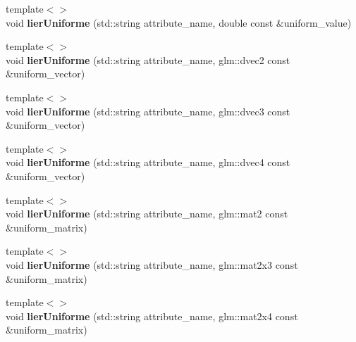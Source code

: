 \begin{DoxyCompactItemize}
\item 
\hypertarget{classopengl_1_1_programme_aee4e82a2c7e972da7a82ffae9c38397e}{}{\footnotesize template$<$$>$ }\\void {\bfseries lier\+Uniforme} (std\+::string attribute\+\_\+name, double const \&uniform\+\_\+value)\label{classopengl_1_1_programme_aee4e82a2c7e972da7a82ffae9c38397e}

\item 
\hypertarget{classopengl_1_1_programme_a0cc2298b3ed6b8075b0ef15ef4881dcc}{}{\footnotesize template$<$$>$ }\\void {\bfseries lier\+Uniforme} (std\+::string attribute\+\_\+name, glm\+::dvec2 const \&uniform\+\_\+vector)\label{classopengl_1_1_programme_a0cc2298b3ed6b8075b0ef15ef4881dcc}

\item 
\hypertarget{classopengl_1_1_programme_a7dc32e56eeb5b6170493135d510e2982}{}{\footnotesize template$<$$>$ }\\void {\bfseries lier\+Uniforme} (std\+::string attribute\+\_\+name, glm\+::dvec3 const \&uniform\+\_\+vector)\label{classopengl_1_1_programme_a7dc32e56eeb5b6170493135d510e2982}

\item 
\hypertarget{classopengl_1_1_programme_a4feb65adc2124550a5260d30503138e5}{}{\footnotesize template$<$$>$ }\\void {\bfseries lier\+Uniforme} (std\+::string attribute\+\_\+name, glm\+::dvec4 const \&uniform\+\_\+vector)\label{classopengl_1_1_programme_a4feb65adc2124550a5260d30503138e5}

\item 
\hypertarget{classopengl_1_1_programme_a9aa8d20c732ef4f47e7073d25dc0ce73}{}{\footnotesize template$<$$>$ }\\void {\bfseries lier\+Uniforme} (std\+::string attribute\+\_\+name, glm\+::mat2 const \&uniform\+\_\+matrix)\label{classopengl_1_1_programme_a9aa8d20c732ef4f47e7073d25dc0ce73}

\item 
\hypertarget{classopengl_1_1_programme_a428f3bb0e560ee6078debadb4ba6f157}{}{\footnotesize template$<$$>$ }\\void {\bfseries lier\+Uniforme} (std\+::string attribute\+\_\+name, glm\+::mat2x3 const \&uniform\+\_\+matrix)\label{classopengl_1_1_programme_a428f3bb0e560ee6078debadb4ba6f157}

\item 
\hypertarget{classopengl_1_1_programme_a96e8372cc909f7bc7c207cfb5832d034}{}{\footnotesize template$<$$>$ }\\void {\bfseries lier\+Uniforme} (std\+::string attribute\+\_\+name, glm\+::mat2x4 const \&uniform\+\_\+matrix)\label{classopengl_1_1_programme_a96e8372cc909f7bc7c207cfb5832d034}


\end{DoxyCompactItemize}
